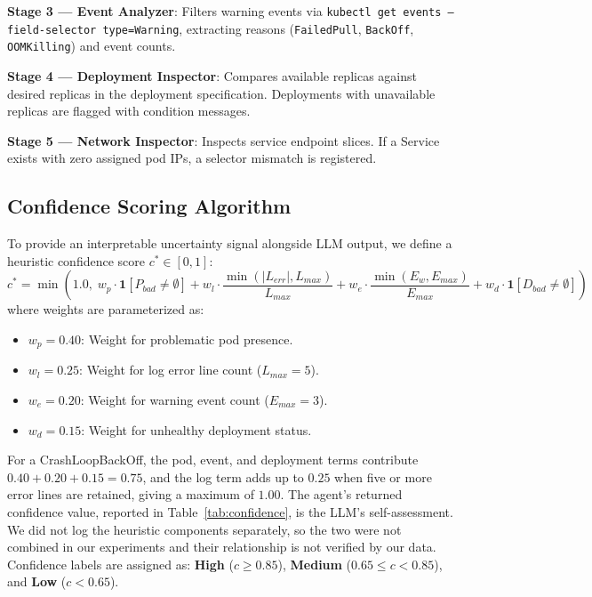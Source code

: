\documentclass[12pt,onecolumn,draftclsnofoot]{IEEEtran}
\begin{document}
\textbf{Stage 3 — Event Analyzer}: Filters warning events via \texttt{kubectl get events --field-selector type=Warning}, extracting reasons (\texttt{FailedPull}, \texttt{BackOff}, \texttt{OOMKilling}) and event counts.

\textbf{Stage 4 — Deployment Inspector}: Compares available replicas against desired replicas in the deployment specification. Deployments with unavailable replicas are flagged with condition messages.

\textbf{Stage 5 — Network Inspector}: Inspects service endpoint slices. If a Service exists with zero assigned pod IPs, a selector mismatch is registered.

\subsection{Confidence Scoring Algorithm}
To provide an interpretable uncertainty signal alongside LLM output, we define a heuristic confidence score $c^* \in [0, 1]$:
\begin{equation}
c^* = \min\!\left(1.0,\; w_p \cdot \mathbf{1}[P_{bad} \neq \emptyset] + w_l \cdot \frac{\min(|L_{err}|, L_{max})}{L_{max}} + w_e \cdot \frac{\min(E_w, E_{max})}{E_{max}} + w_d \cdot \mathbf{1}[D_{bad} \neq \emptyset]\right)
\label{eq:conf}
\end{equation}
where weights are parameterized as:
\begin{itemize}
  \item $w_p = 0.40$: Weight for problematic pod presence.
  \item $w_l = 0.25$: Weight for log error line count ($L_{max} = 5$).
  \item $w_e = 0.20$: Weight for warning event count ($E_{max} = 3$).
  \item $w_d = 0.15$: Weight for unhealthy deployment status.
\end{itemize}

For a CrashLoopBackOff, the pod, event, and deployment terms contribute $0.40 + 0.20 + 0.15 = 0.75$, and the log term adds up to $0.25$ when five or more error lines are retained, giving a maximum of $1.00$. The agent's returned confidence value, reported in Table~\ref{tab:confidence}, is the LLM's self-assessment. We did not log the heuristic components separately, so the two were not combined in our experiments and their relationship is not verified by our data. Confidence labels are assigned as: \textbf{High} ($c \geq 0.85$), \textbf{Medium} ($0.65 \leq c < 0.85$), and \textbf{Low} ($c < 0.65$).
\end{document}
